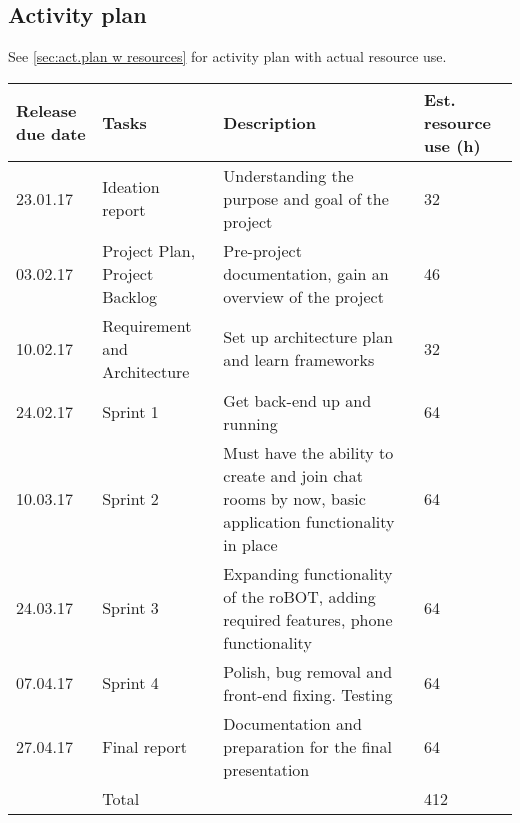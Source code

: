 \subsection{Activity plan}
See \cref{sec:act.plan w resources} for activity plan with actual resource use.

\begin{adjustbox}{center}
\begin{tabular}{ p{0.1\paperwidth} | p{0.1\paperwidth} | p{} | p{0.1\paperwidth} }
    Release due date 
    & Tasks 
    & Description
    & Est. \newline resource \newline use (h)
   \\ \hline
    23.01.17 
    & Ideation report
    & Understanding the purpose and goal of the project
    & 32
    \\ \hline
    03.02.17
    & Project Plan, Project Backlog
    & Pre-project documentation, gain an overview of the project
    & 46
    \\ \hline
    10.02.17
    & Requirement and Architecture
    & Set up architecture plan and learn frameworks
    & 32 
    \\ \hline
    24.02.17
    & Sprint 1
    & Get back-end up and running
    & 64 
    \\ \hline
    10.03.17
    & Sprint 2
    & Must have the ability to create and join chat rooms by now, basic application functionality in place
    & 64 
    \\ \hline
    24.03.17
    & Sprint 3
    & Expanding functionality of the roBOT, adding required features, phone functionality
    & 64
    \\ \hline
    07.04.17
    & Sprint 4
    & Polish, bug removal and front-end fixing. Testing
    & 64
    \\ \hline
    27.04.17
    & Final report
    & Documentation and preparation for the final presentation
    & 64
    \\ \hline
    & Total
    & 
    & 412
    
\end{tabular}
\end{adjustbox}

